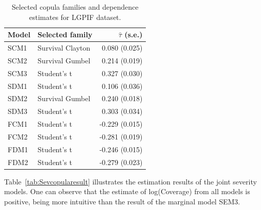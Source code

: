 \documentclass[11pt]{article}
\newcommand{\rev}[1]{{\color{blue}#1}}
\begin{document}
{\begin{table}[h!]
\centering\small
\begin{tabular}{llr}
\toprule
Model  & Selected family & $\widehat\tau$ (s.e.)  \\
\midrule
SCM1 & Survival Clayton & 0.080 (0.025) \\
SCM2 & Survival Gumbel & 0.214 (0.019) \\
SCM3 & Student's t & 0.327 (0.030) \\
SDM1 & Student's t & 0.106 (0.036) \\
SDM2 & Survival Gumbel & 0.240 (0.018) \\
SDM3 & Student's t & 0.303 (0.034) \\
\midrule
FCM1 & Student's t & -0.229 (0.015) \\
FCM2 & Student's t & -0.281 (0.019) \\
FDM1 & Student's t & -0.246 (0.015) \\
FDM2 & Student's t & -0.279 (0.023) \\

\bottomrule
\end{tabular}
\caption{Selected copula families and dependence estimates for LGPIF dataset.}
\label{tab:lgpif_dependence}
\end{table}

\rev{Table~\ref{tab:Sevcopularesult} illustrates the estimation results of the joint severity models. One can observe that the estimate of log(Coverage) from all models is positive, being more intuitive than the result of the marginal model SEM3. }

}
\end{document}
